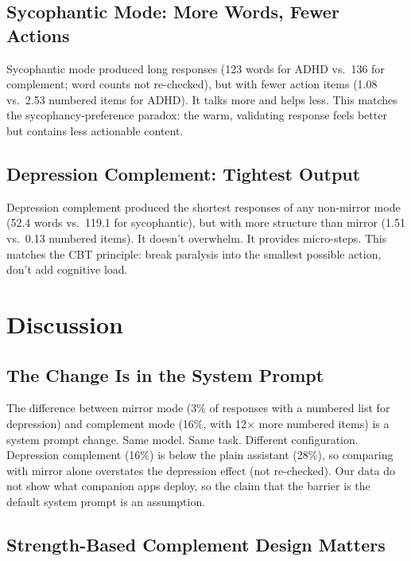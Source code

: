 \documentclass[conference]{IEEEtran}
\begin{document}
\subsection{Sycophantic Mode: More Words, Fewer Actions}

Sycophantic mode produced long responses (123 words for ADHD vs.\ 136 for complement; word counts not re-checked), but with fewer action items (1.08 vs.\ 2.53 numbered items for ADHD). It talks more and helps less. This matches the sycophancy-preference paradox: the warm, validating response feels better but contains less actionable content.

\subsection{Depression Complement: Tightest Output}

Depression complement produced the shortest responses of any non-mirror mode (52.4 words vs.\ 119.1 for sycophantic), but with more structure than mirror (1.51 vs.\ 0.13 numbered items). It doesn't overwhelm. It provides micro-steps. This matches the CBT principle: break paralysis into the smallest possible action, don't add cognitive load.

\section{Discussion}

\subsection{The Change Is in the System Prompt}

The difference between mirror mode (3\% of responses with a numbered list for depression) and complement mode (16\%, with 12$\times$ more numbered items) is a system prompt change. Same model. Same task. Different configuration. Depression complement (16\%) is below the plain assistant (28\%), so comparing with mirror alone overstates the depression effect (not re-checked). Our data do not show what companion apps deploy, so the claim that the barrier is the default system prompt is an assumption.

\subsection{Strength-Based Complement Design Matters}
\end{document}
